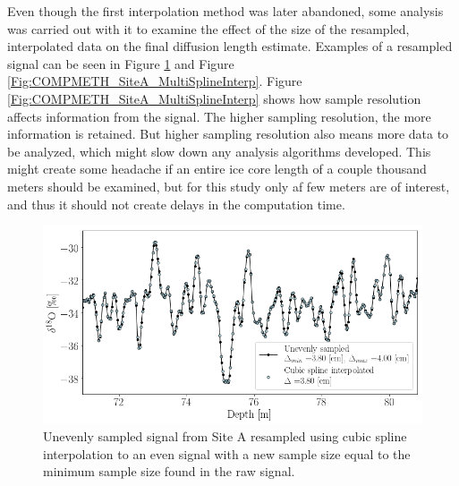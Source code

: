 \documentclass[../../CompleteThesis2/Complete_2ndDraft]{subfiles}
\begin{document}
Even though the first interpolation method was later abandoned, some analysis was carried out with it to examine the effect of the size of the resampled, interpolated data on the final diffusion length estimate. Examples of a resampled signal can be seen in Figure \ref{Fig:COMPMETH_SiteA_DataSplineInterp} and Figure \ref{Fig:COMPMETH_SiteA_MultiSplineInterp}. Figure \ref{Fig:COMPMETH_SiteA_MultiSplineInterp} shows how sample resolution affects information from the signal. The higher sampling resolution, the more information is retained. But higher sampling resolution also means more data to be analyzed, which might slow down any analysis algorithms developed. This might create some headache if an entire ice core length of a couple thousand meters should be examined, but for this study only af few meters are of interest, and thus it should not create delays in the computation time.

\begin{figure}[h]
	\centering
	\includegraphics[width=\textwidth]{SiteA_DataSplineInterp.png}
	\caption[Even resampling of unevenly sampled data, Site A.]{\small Unevenly sampled signal from Site A resampled using cubic spline interpolation to an even signal with a new sample size equal to the minimum sample size found in the raw signal.}
	\label{Fig:COMPMETH_SiteA_DataSplineInterp}
\end{figure}
\end{document}
